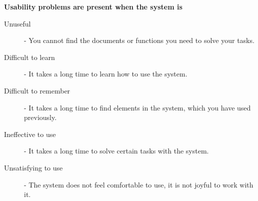 \textbf{Usability problems are present when the system is}
\begin{description}
	\item[Unuseful] - You cannot find the documents or functions you need to solve your tasks.
	\item[Difficult to learn] - It takes a long time to learn how to use the system.
	\item[Difficult to remember] - It takes a long time to find elements in the system, which you have used previously.
	\item[Ineffective to use] - It takes a long time to solve certain tasks with the system.
	\item[Unsatisfying to use] - The system does not feel comfortable to use, it is not joyful to work with it.
\end{description}